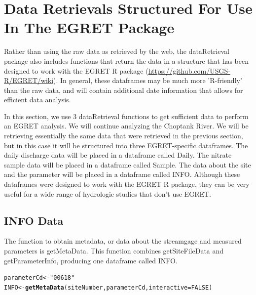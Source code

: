 \documentclass[a4paper,11pt]{article}\usepackage[]{graphicx}\usepackage[]{color}
\makeatletter
\newcommand{\hlnum}[1]{\textcolor[rgb]{0.686,0.059,0.569}{#1}}%
\newcommand{\hlstr}[1]{\textcolor[rgb]{0.192,0.494,0.8}{#1}}%
\newcommand{\hlstd}[1]{\textcolor[rgb]{0.345,0.345,0.345}{#1}}%
\newcommand{\hlkwb}[1]{\textcolor[rgb]{0.69,0.353,0.396}{#1}}%
\newcommand{\hlkwc}[1]{\textcolor[rgb]{0.333,0.667,0.333}{#1}}%
\newcommand{\hlkwd}[1]{\textcolor[rgb]{0.737,0.353,0.396}{\textbf{#1}}}%
\newenvironment{kframe}{%
 \def\at@end@of@kframe{}%
 \ifinner\ifhmode%
  \def\at@end@of@kframe{\end{minipage}}%
  \begin{minipage}{\columnwidth}%
 \fi\fi%
 \def\FrameCommand##1{\hskip\@totalleftmargin \hskip-\fboxsep
 \colorbox{shadecolor}{##1}\hskip-\fboxsep
     \hskip-\linewidth \hskip-\@totalleftmargin \hskip\columnwidth}%
 \MakeFramed {\advance\hsize-\width
   \@totalleftmargin\z@ \linewidth\hsize
   \@setminipage}}%
 {\par\unskip\endMakeFramed%
 \at@end@of@kframe}
\newenvironment{knitrout}{}{} %
\makeatother
\begin{document}
\FloatBarrier

\section{Data Retrievals Structured For Use In The EGRET Package}
Rather than using the raw data as retrieved by the web, the dataRetrieval package also includes functions that return the data in a structure that has been designed to work with the EGRET R package (\url{https://github.com/USGS-R/EGRET/wiki}). In general, these dataframes may be much more 'R-friendly' than the raw data, and will contain additional date information that allows for efficient data analysis.

In this section, we use 3 dataRetrieval functions to get sufficient data to perform an EGRET analysis.  We will continue analyzing the Choptank River. We will be retrieving essentially the same data that were retrieved in the previous section, but in this case it will be structured into three EGRET-specific dataframes.  The daily discharge data will be placed in a dataframe called Daily.  The nitrate sample data will be placed in a dataframe called Sample.  The data about the site and the parameter will be placed in a dataframe called INFO.  Although these dataframes were designed to work with the EGRET R package, they can be very useful for a wide range of hydrologic studies that don't use EGRET.

\subsection{INFO Data}
The function to obtain metadata, or data about the streamgage and measured parameters is getMetaData. This function combines getSiteFileData and getParameterInfo, producing one dataframe called INFO.

\begin{knitrout}
\color{fgcolor}\begin{kframe}
\begin{alltt}
\hlstd{parameterCd} \hlkwb{<-} \hlstr{"00618"}
\hlstd{INFO} \hlkwb{<-}\hlkwd{getMetaData}\hlstd{(siteNumber,parameterCd,} \hlkwc{interactive}\hlstd{=}\hlnum{FALSE}\hlstd{)}
\end{alltt}
\end{kframe}
\end{knitrout}
\end{document}

